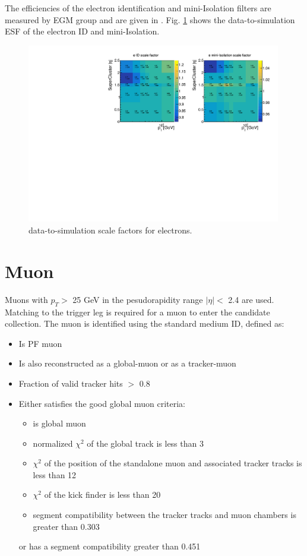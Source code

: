 \documentclass[thesis.tex]{subfiles}
\renewcommand\_{\textunderscore\allowbreak}
\begin{document}
The efficiencies of the electron identification and mini-Isolation filters are measured by EGM group and are given in \cite{EGM:leptonScale}. Fig. \ref{fig:elesf} shows the data-to-simulation ESF of the electron ID and mini-Isolation. 

\begin{figure}[hbtp]
	\centering
	\includegraphics[width=0.99\textwidth]{plot/SF_Ele.pdf}
	\caption{data-to-simulation scale factors for electrons.}
	\label{fig:elesf}
\end{figure}

\section{Muon}
Muons with $p_{T} >$ 25 GeV in the pesudorapidity range $|\eta| <$ 2.4 are used. 
Matching to the trigger leg is required for a muon to enter the candidate collection. 
The muon is identified using the standard medium ID, defined as:

\begin{center}
\begin{itemize}
\item Is PF muon
\item Is also reconstructed as a global-muon or as a tracker-muon
\item Fraction of valid tracker hits $>$ 0.8
\item Either satisfies the good global muon criteria:
	\begin{itemize}
		\item is global muon
		\item normalized $\chi^2$ of the global track is less than 3
		\item $\chi^2$ of the position of the standalone muon and associated tracker tracks is less than 12
		\item $\chi^2$ of the kick finder is less than 20
		\item segment compatibility between the tracker tracks and muon chambers is greater than 0.303
	\end{itemize} 
	or has a segment compatibility greater than 0.451
\end{itemize}
\end{center}
\end{document}
